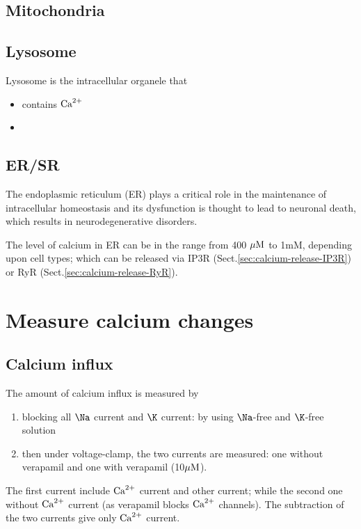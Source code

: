 \subsection{Mitochondria}
\label{sec:calcium-mitochondria}


\subsection{Lysosome}
\label{sec:lysosome}

Lysosome is the intracellular organele that
\begin{itemize}
  \item contains ${\text{Ca}^{2+}}$
  \item 
\end{itemize}
\subsection{ER/SR}

\label{sec:calcium-ER}

The endoplasmic reticulum (ER) plays a critical role in the maintenance of
intracellular homeostasis and its dysfunction is thought to lead to neuronal
death, which results in neurodegenerative disorders. 

The level of calcium in ER can be in the range from 400 ${\mu\text{M}}$ to 1mM, depending
upon cell types; which can be released via IP3R
(Sect.\ref{sec:calcium-release-IP3R}) or RyR
(Sect.\ref{sec:calcium-release-RyR}).





\section{Measure calcium changes}
\subsection{Calcium influx}

The amount of calcium influx is measured by 
\begin{enumerate}
  \item blocking all $\Na$ current and $\K$ current: by using $\Na$-free 
  and $\K$-free solution
  
  
  \item then under voltage-clamp, the two currents are measured:
  one without verapamil and one with verapamil (10${\mu\text{M}}$).
\end{enumerate}
The first current include ${\text{Ca}^{2+}}$ current and other current; while the second one 
without ${\text{Ca}^{2+}}$ current (as verapamil blocks ${\text{Ca}^{2+}}$ channels). 
The subtraction of the two currents give only ${\text{Ca}^{2+}}$ current. 


